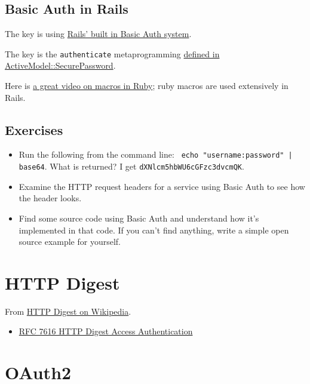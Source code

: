 \documentclass{article}
\begin{document}
\subsection{Basic Auth in Rails}

The key is using \href{https://github.com/rails/rails/blob/master/actionpack/lib/action_controller/metal/http_authentication.rb}{%
Rails' built in Basic Auth system}.

The key is the \texttt{authenticate} metaprogramming
\href{https://github.com/rails/rails/blob/master/activemodel/lib/active_model/secure_password.rb#L119}{%
  defined in ActiveModel::SecurePassword}.

Here is \href{https://www.youtube.com/watch?v=O1sgFzn_Pgk}{%
a great video on macros in Ruby}; ruby macros are used extensively in Rails.

\subsection{Exercises}

\begin{itemize}
  \item Run the following from the command line: \texttt{%
      echo "username:password" | base64}. What is returned?
    I get \texttt{dXNlcm5hbWU6cGFzc3dvcmQK}.
  \item Examine the HTTP request headers for a service using Basic Auth
    to see how the header looks.
  \item Find some source code using Basic Auth and understand how
    it's implemented in that code. If you can't find anything, write
    a simple open source example for yourself.
\end{itemize}

\section{HTTP Digest}


From \href{https://en.wikipedia.org/wiki/Digest_access_authentication}{HTTP Digest on Wikipedia}.

\begin{itemize}
  \item \href{https://tools.ietf.org/html/rfc7616}{%
      RFC 7616 HTTP Digest Access Authentication}
\end{itemize}

\section{OAuth2}
\end{document}
